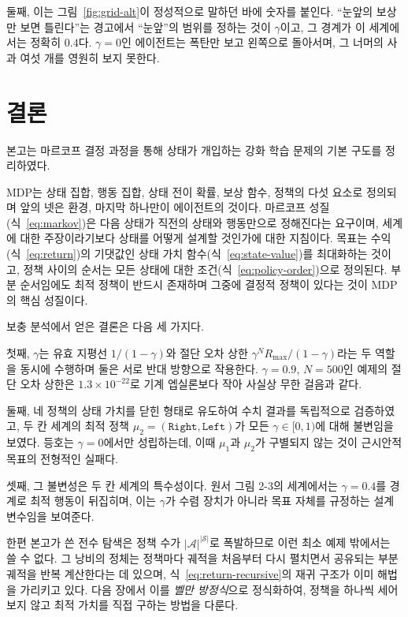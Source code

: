 \documentclass[11pt,a4paper]{article}
\newcommand{\Sset}{\mathcal{S}}
\newcommand{\Aset}{\mathcal{A}}
\begin{document}
둘째, 이는 그림~\ref{fig:grid-alt}이 정성적으로 말하던 바에 숫자를 붙인다. ``눈앞의 보상만 보면
틀린다''는 경고에서 ``눈앞''의 범위를 정하는 것이 $\gamma$이고, 그 경계가 이 세계에서는 정확히
$0.4$다. $\gamma=0$인 에이전트는 폭탄만 보고 왼쪽으로 돌아서며, 그 너머의 사과 여섯 개를 영원히
보지 못한다.

\section{결론}

본고는 마르코프 결정 과정을 통해 상태가 개입하는 강화 학습 문제의 기본 구도를 정리하였다.

MDP는 상태 집합, 행동 집합, 상태 전이 확률, 보상 함수, 정책의 다섯 요소로 정의되며 앞의 넷은 환경,
마지막 하나만이 에이전트의 것이다. 마르코프 성질(식~\eqref{eq:markov})은 다음 상태가 직전의 상태와
행동만으로 정해진다는 요구이며, 세계에 대한 주장이라기보다 상태를 어떻게 설계할 것인가에 대한
지침이다. 목표는 수익(식~\eqref{eq:return})의 기댓값인 상태 가치 함수(식~\eqref{eq:state-value})를
최대화하는 것이고, 정책 사이의 순서는 모든 상태에 대한 조건(식~\eqref{eq:policy-order})으로 정의된다.
부분 순서임에도 최적 정책이 반드시 존재하며 그중에 결정적 정책이 있다는 것이 MDP의 핵심 성질이다.

보충 분석에서 얻은 결론은 다음 세 가지다.

첫째, $\gamma$는 유효 지평선 $1/(1-\gamma)$와 절단 오차 상한 $\gamma^N R_{\max}/(1-\gamma)$라는 두
역할을 동시에 수행하며 둘은 서로 반대 방향으로 작용한다. $\gamma=0.9$, $N=500$인 예제의 절단 오차
상한은 $1.3\times10^{-22}$로 기계 엡실론보다 작아 사실상 무한 걸음과 같다.

둘째, 네 정책의 상태 가치를 닫힌 형태로 유도하여 수치 결과를 독립적으로 검증하였고, 두 칸 세계의
최적 정책 $\mu_2=(\texttt{Right},\texttt{Left})$가 모든 $\gamma\in[0,1)$에 대해 불변임을 보였다.
등호는 $\gamma=0$에서만 성립하는데, 이때 $\mu_1$과 $\mu_2$가 구별되지 않는 것이 근시안적 목표의
전형적인 실패다.

셋째, 그 불변성은 두 칸 세계의 특수성이다. 원서 그림 2-3의 세계에서는 $\gamma=0.4$를 경계로 최적
행동이 뒤집히며, 이는 $\gamma$가 수렴 장치가 아니라 목표 자체를 규정하는 설계 변수임을 보여준다.

한편 본고가 쓴 전수 탐색은 정책 수가 $|\Aset|^{|\Sset|}$로 폭발하므로 이런 최소 예제 밖에서는 쓸 수 없다.
그 낭비의 정체는 정책마다 궤적을 처음부터 다시 펼치면서 공유되는 부분 궤적을 반복 계산한다는 데
있으며, 식~\eqref{eq:return-recursive}의 재귀 구조가 이미 해법을 가리키고 있다. 다음 장에서 이를
\emph{벨만 방정식}으로 정식화하여, 정책을 하나씩 세어 보지 않고 최적 가치를 직접 구하는 방법을
다룬다.
\end{document}
